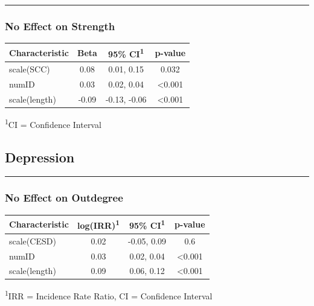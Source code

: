 \documentclass[
  .7em,
  letterpaper,
  DIV=11,
  numbers=noendperiod]{scrartcl}
\begin{document}
\begin{center}\rule{0.5\linewidth}{0.5pt}\end{center}

\hypertarget{no-effect-on-strength}{%
\subsubsection{No Effect on Strength}\label{no-effect-on-strength}}

\captionsetup[table]{labelformat=empty,skip=1pt}
\setlength{\LTpost}{0mm}
\begin{longtable}{lccc}
\toprule
\textbf{Characteristic} & \textbf{Beta} & \textbf{95\% CI}\textsuperscript{1} & \textbf{p-value} \\ 
\midrule
scale(SCC) & 0.08 & 0.01, 0.15 & 0.032 \\ 
numID & 0.03 & 0.02, 0.04 & <0.001 \\ 
scale(length) & -0.09 & -0.13, -0.06 & <0.001 \\ 
\bottomrule
\end{longtable}
\begin{minipage}{\linewidth}
\textsuperscript{1}CI = Confidence Interval\\
\end{minipage}

\hypertarget{depression}{%
\subsection{Depression}\label{depression}}

\begin{center}\rule{0.5\linewidth}{0.5pt}\end{center}

\hypertarget{no-effect-on-outdegree-2}{%
\subsubsection{No Effect on Outdegree}\label{no-effect-on-outdegree-2}}

\captionsetup[table]{labelformat=empty,skip=1pt}
\setlength{\LTpost}{0mm}
\begin{longtable}{lccc}
\toprule
\textbf{Characteristic} & \textbf{log(IRR)}\textsuperscript{1} & \textbf{95\% CI}\textsuperscript{1} & \textbf{p-value} \\ 
\midrule
scale(CESD) & 0.02 & -0.05, 0.09 & 0.6 \\ 
numID & 0.03 & 0.02, 0.04 & <0.001 \\ 
scale(length) & 0.09 & 0.06, 0.12 & <0.001 \\ 
\bottomrule
\end{longtable}
\begin{minipage}{\linewidth}
\textsuperscript{1}IRR = Incidence Rate Ratio, CI = Confidence Interval\\
\end{minipage}
\end{document}
